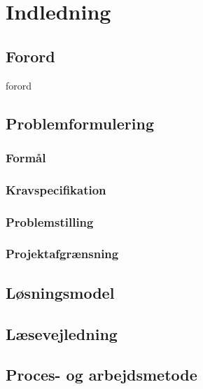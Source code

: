 \chapter{Indledning}

\section{Forord}\label{sec:forord}
forord

\section{Problemformulering}


\subsection{Formål}


\subsection{Kravspecifikation} \label{afs:kravspecifikation}

\subsection{Problemstilling}

\subsection{Projektafgrænsning}

\section{Løsningsmodel}

\section{Læsevejledning}

\section{Proces- og arbejdsmetode}
